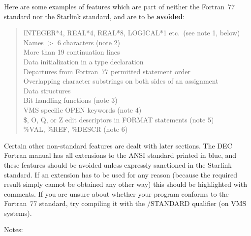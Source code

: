 \documentclass[twoside,11pt]{article}
\renewcommand{\_}{{\tt\char'137}}
\begin{document}
Here are some examples of features which are part of neither the Fortran~77
standard nor the Starlink standard, and are to be {\bf avoided}:
\begin{quote}
INTEGER*4, REAL*4, REAL*8, LOGICAL*1 etc.\ (see note 1, below)\\
Names $>$ 6 characters (note 2)\\
More than 19 continuation lines\\
Data initialization in a type declaration\\
Departures from Fortran~77 permitted statement order\\
Overlapping character substrings on both sides of an assignment\\
Data structures\\
Bit handling functions (note 3)\\
VMS specific OPEN keywords (note 4)\\
\$, O, Q, or Z edit descriptors in FORMAT statements (note 5)\\
\%VAL, \%REF, \%DESCR (note 6)
\end{quote}
Certain other non-standard features are dealt with later sections.
The DEC Fortran manual has all extensions to the ANSI standard
printed in blue, and these features should be avoided unless
expressly sanctioned in the Starlink standard.  If an
extension has to be used for any reason (because the required
result simply cannot be obtained any other way) this should
be highlighted with comments.  If you are unsure about whether
your program conforms to the Fortran~77 standard, try compiling
it with the /STANDARD qualifier (on VMS systems).

Notes:
\end{document}
